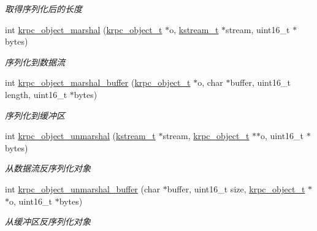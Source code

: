 \begin{DoxyCompactItemize}
\begin{DoxyCompactList}\small\item\em 取得序列化后的长度 \end{DoxyCompactList}\item 
int \hyperlink{a00119_ga77cc2dde006f9cdddf078289159bd514_ga77cc2dde006f9cdddf078289159bd514}{krpc\+\_\+object\+\_\+marshal} (\hyperlink{a00056_a9c07dfc8c3b965f75b09f82fdb1bbb1e_a9c07dfc8c3b965f75b09f82fdb1bbb1e}{krpc\+\_\+object\+\_\+t} $\ast$o, \hyperlink{a00056_acc208c4c40c875eebbfef88f00fffacf_acc208c4c40c875eebbfef88f00fffacf}{kstream\+\_\+t} $\ast$stream, uint16\+\_\+t $\ast$bytes)
\begin{DoxyCompactList}\small\item\em 序列化到数据流 \end{DoxyCompactList}\item 
int \hyperlink{a00119_ga32ed12c4faa68e258582b239b46fd180_ga32ed12c4faa68e258582b239b46fd180}{krpc\+\_\+object\+\_\+marshal\+\_\+buffer} (\hyperlink{a00056_a9c07dfc8c3b965f75b09f82fdb1bbb1e_a9c07dfc8c3b965f75b09f82fdb1bbb1e}{krpc\+\_\+object\+\_\+t} $\ast$o, char $\ast$buffer, uint16\+\_\+t length, uint16\+\_\+t $\ast$bytes)
\begin{DoxyCompactList}\small\item\em 序列化到缓冲区 \end{DoxyCompactList}\item 
int \hyperlink{a00119_ga3e61d7f696fd28c1cb4152037e4cc3c8_ga3e61d7f696fd28c1cb4152037e4cc3c8}{krpc\+\_\+object\+\_\+unmarshal} (\hyperlink{a00056_acc208c4c40c875eebbfef88f00fffacf_acc208c4c40c875eebbfef88f00fffacf}{kstream\+\_\+t} $\ast$stream, \hyperlink{a00056_a9c07dfc8c3b965f75b09f82fdb1bbb1e_a9c07dfc8c3b965f75b09f82fdb1bbb1e}{krpc\+\_\+object\+\_\+t} $\ast$$\ast$o, uint16\+\_\+t $\ast$bytes)
\begin{DoxyCompactList}\small\item\em 从数据流反序列化对象 \end{DoxyCompactList}\item 
int \hyperlink{a00119_ga0f2289e356949bc9ae0e8e0a151e42f4_ga0f2289e356949bc9ae0e8e0a151e42f4}{krpc\+\_\+object\+\_\+unmarshal\+\_\+buffer} (char $\ast$buffer, uint16\+\_\+t size, \hyperlink{a00056_a9c07dfc8c3b965f75b09f82fdb1bbb1e_a9c07dfc8c3b965f75b09f82fdb1bbb1e}{krpc\+\_\+object\+\_\+t} $\ast$$\ast$o, uint16\+\_\+t $\ast$bytes)
\begin{DoxyCompactList}\small\item\em 从缓冲区反序列化对象 \end{DoxyCompactList}\item 

\end{DoxyCompactItemize}
